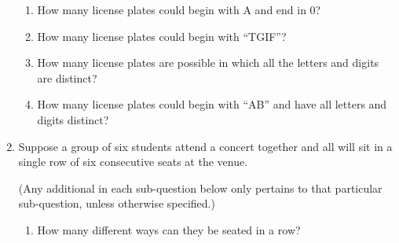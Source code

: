 \documentclass[11pt, letterpaper]{report}
\begin{document}
\begin{enumerate}
\begin{enumerate}
        
        
        \item How many license plates could begin with A and end in 0? 
        
        
        \item How many license plates could begin with ``TGIF''?
        
        
        \item How many license plates are possible in which all the letters and digits are distinct?
        
        
        
        \item How many license plates could begin with ``AB'' and have all letters and digits distinct?
        
\end{enumerate}


\item
Suppose a group of six students attend a concert together and all will sit in a single
row of six consecutive seats at the venue.

(Any additional in each sub-question below only pertains to that particular sub-question,
unless otherwise specified.) 
\begin{enumerate}
\item
How many different ways can they be seated in a row?


\end{enumerate}
\end{enumerate}
\end{document}
